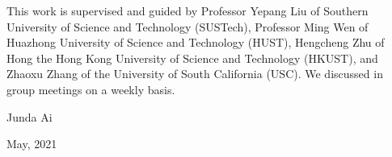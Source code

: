 \begin{thanks}

  This work is supervised and guided by Professor Yepang Liu of Southern University of Science and Technology (SUSTech), Professor Ming Wen of Huazhong University of Science and Technology (HUST), Hengcheng Zhu of Hong the Hong Kong University of Science and Technology (HKUST), and Zhaoxu Zhang of the University of South California (USC). We discussed in group meetings on a weekly basis.

\vskip 18pt

\begin{flushright}

Junda Ai

May, 2021

\end{flushright}

\end{thanks}
